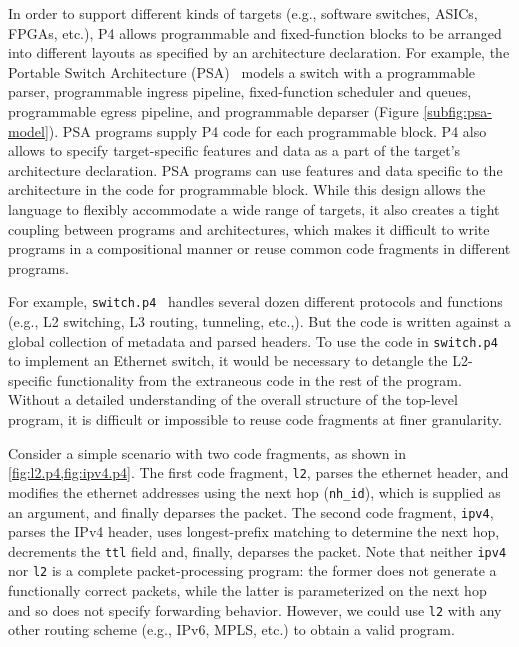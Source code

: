 \documentclass[letterpaper,twocolumn,10pt]{article}
\begin{document}
In order to support different kinds of targets (e.g., software
switches, ASICs, FPGAs, etc.), P4 allows programmable and
fixed-function blocks to be arranged into different layouts as
specified by an architecture declaration. For example, the Portable
Switch Architecture (PSA)~\cite{psa} models a switch with a
programmable parser, programmable ingress pipeline, fixed-function
scheduler and queues, programmable egress pipeline, and programmable
deparser (Figure \ref{subfig:psa-model}).  PSA programs supply P4 code
for each programmable block.  P4 also allows to specify
target-specific features and data as a part of the target's
architecture declaration.  PSA programs can use features and data
specific to the architecture in the code for programmable block.
While this design allows the language to flexibly accommodate a wide
range of targets, it also creates a tight coupling between programs
and architectures, which makes it difficult to write programs in a
compositional manner or reuse common code fragments in different
programs.

For example, \texttt{switch.p4}~\cite{switch.p4} handles several dozen
different protocols and functions (e.g., L2 switching, L3 routing,
tunneling, etc.,). But the code is written against a global collection
of metadata and parsed headers. To use the code in \texttt{switch.p4}
to implement an Ethernet switch, it would be necessary to detangle the
L2-specific functionality from the extraneous code in the rest of the
program. Without a detailed understanding of the overall structure of
the top-level program, it is difficult or impossible to reuse code
fragments at finer granularity.

Consider a simple scenario with two code fragments, as shown in
\cref{fig:l2.p4,fig:ipv4.p4}. The first code fragment, \texttt{l2},
parses the ethernet header, and modifies the ethernet addresses using
the next hop (\texttt{nh\_id}), which is supplied as an argument, and
finally deparses the packet. The second code fragment, \texttt{ipv4},
parses the IPv4 header, uses longest-prefix matching to determine the
next hop, decrements the \texttt{ttl} field and, finally, deparses the
packet.  Note that neither \texttt{ipv4} nor \texttt{l2} is a complete
packet-processing program: the former does not generate a functionally
correct packets, while the latter is parameterized on the next hop and
so does not specify forwarding behavior. However, we could use
\texttt{l2} with any other routing scheme (e.g., IPv6, MPLS, etc.) to
obtain a valid program.
\end{document}
